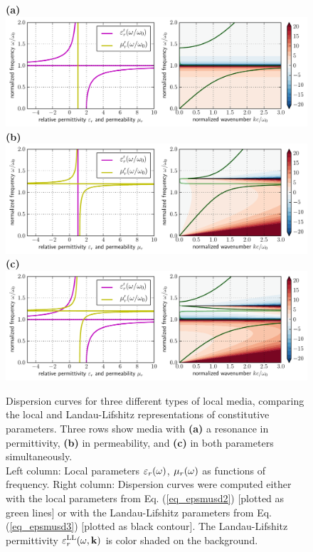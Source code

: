 \begin{figure}[t] \caption{Dispersion curves for three different types of local media, comparing the local and Landau-Lifshitz representations of constitutive parameters. Three rows show media with \textbf{(a)} a  resonance in permittivity, \textbf{(b)} in permeability, and \textbf{(c)} in both parameters simultaneously.\\
Left column: Local parameters $\varepsilon_r(\omega)$, $\mu_r(\omega)$ as functions of frequency. Right column: Dispersion curves were computed either with the local parameters from Eq. (\ref{eq_epsmusd2}) [plotted as green lines] or with the Landau-Lifshitz parameters from Eq. (\ref{eq_epsmusd3}) [plotted as black contour]. The Landau-Lifshitz permittivity $\varepsilon_r^\text{LL}(\omega,{\mathbf{k}})$ is color shaded on the background.
} \label{fg_dcll} \centering  
\textbf{(a)}\\\includegraphics[width=1\textwidth]{img/dispersion_landau_lifshitz/dispersion_ll_el.pdf}    
\textbf{(b)}\\\includegraphics[width=1\textwidth]{img/dispersion_landau_lifshitz/dispersion_ll_mag.pdf}
\textbf{(c)}\\\includegraphics[width=1\textwidth]{img/dispersion_landau_lifshitz/dispersion_ll_elmag.pdf}
\end{figure}
\clearpage

